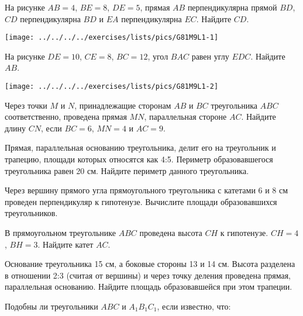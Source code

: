 %
%

\begin{class}[number=1]
	\begin{listofex}
		\item 
		\begin{minipage}[t]{\bodywidth}
			На рисунке \( AB = 4 \), \( BE = 8 \), \( DE = 5 \), прямая \( AB \) перпендикулярна прямой \( BD \), \( CD \) перпендикулярна \( BD \) и \( EA \) перпендикулярна \( EC \).	Найдите \( CD \). 
		\end{minipage}
		\hspace{0.02\linewidth}
		\begin{minipage}[t]{\picwidth}
			\texttt{[image: ../../../../exercises/lists/pics/G81M9L1-1]}
		\end{minipage}
		\item 
		\begin{minipage}[t]{\bodywidth}
			На рисунке \( DE = 10 \), \( CE = 8 \), \( BC = 12 \), угол \( BAC \) равен углу \(  EDC \). Найдите \( AB \).
		\end{minipage}
		\hspace{0.02\linewidth}
		\begin{minipage}[t]{\picwidth}
			\texttt{[image: ../../../../exercises/lists/pics/G81M9L1-2]}
		\end{minipage}
		\item Через точки \( M \) и \( N \), принадлежащие сторонам \( AB \) и \( BC  \) треугольника \(  ABC \) соответственно, проведена прямая \( MN \), параллельная стороне \( AC \). Найдите длину \( CN \), если \( BC = 6 \), \( MN = 4 \) и \( AC = 9 \).
		\item  Прямая, параллельная основанию треугольника, делит его на треугольник и трапецию, площади которых относятся как 4:5. Периметр образовавшегося треугольника равен 20 см. Найдите периметр данного треугольника.
		\item Через вершину прямого угла прямоугольного треугольника с катетами 6 и 8 см проведен перпендикуляр к гипотенузе. Вычислите площади образовавшихся треугольников.		
		\item  В прямоугольном треугольнике \( ABC \) проведена высота \( CH \) к гипотенузе. \( CH=4 \), \( BH=3 \). Найдите катет \( AC \).		
		\item  Основание треугольника 15 см, а боковые стороны 13 и 14 см. Высота разделена в отношении 2:3 (считая от вершины) и через точку деления проведена прямая, параллельная основанию. Найдите площадь образовавшейся при этом трапеции. 
		\item Подобны ли треугольники \( ABC \) и \( A_1B_1C_1 \), если известно, что:
		

\end{listofex}
\end{class}
